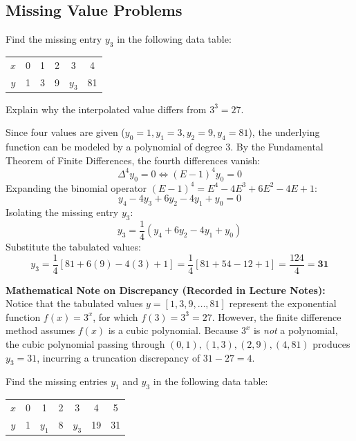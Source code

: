 \documentclass[11pt,a4paper]{article}
\begin{document}
\subsection{Missing Value Problems}

\begin{exambox}
Find the missing entry $y_3$ in the following data table:
\begin{center}
\begin{tabular}{cccccc}
    \toprule
    $x$ & 0 & 1 & 2 & 3 & 4 \\
    $y$ & 1 & 3 & 9 & $y_3$ & 81 \\
    \bottomrule
\end{tabular}
\end{center}
Explain why the interpolated value differs from $3^3 = 27$.
\end{exambox}

\begin{solbox}
Since four values are given ($y_0 = 1, y_1 = 3, y_2 = 9, y_4 = 81$), the underlying function can be modeled by a polynomial of degree 3. By the Fundamental Theorem of Finite Differences, the fourth differences vanish:
$$\Delta^4 y_0 = 0 \iff (E - 1)^4 y_0 = 0$$
Expanding the binomial operator $(E - 1)^4 = E^4 - 4E^3 + 6E^2 - 4E + 1$:
$$y_4 - 4y_3 + 6y_2 - 4y_1 + y_0 = 0$$
Isolating the missing entry $y_3$:
$$y_3 = \frac{1}{4}\left(y_4 + 6y_2 - 4y_1 + y_0\right)$$
Substitute the tabulated values:
$$y_3 = \frac{1}{4}\left[81 + 6(9) - 4(3) + 1\right] = \frac{1}{4}\left[81 + 54 - 12 + 1\right] = \frac{124}{4} = \mathbf{31}$$

\textbf{Mathematical Note on Discrepancy (Recorded in Lecture Notes):}
Notice that the tabulated values $y = [1, 3, 9, \dots, 81]$ represent the exponential function $f(x) = 3^x$, for which $f(3) = 3^3 = 27$. However, the finite difference method assumes $f(x)$ is a cubic polynomial. Because $3^x$ is \emph{not} a polynomial, the cubic polynomial passing through $(0,1), (1,3), (2,9), (4,81)$ produces $y_3 = 31$, incurring a truncation discrepancy of $31 - 27 = 4$.
\end{solbox}

\begin{exambox}
Find the missing entries $y_1$ and $y_3$ in the following data table:
\begin{center}
\begin{tabular}{ccccccc}
    \toprule
    $x$ & 0 & 1 & 2 & 3 & 4 & 5 \\
    $y$ & 1 & $y_1$ & 8 & $y_3$ & 19 & 31 \\
    \bottomrule
\end{tabular}
\end{center}
\end{exambox}
\end{document}
